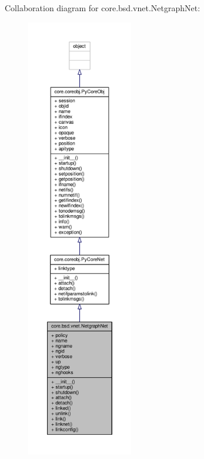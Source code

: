 Collaboration diagram for core.\+bsd.\+vnet.\+Netgraph\+Net\+:
\nopagebreak
\begin{figure}[H]
\begin{center}
\leavevmode
\includegraphics[height=550pt]{classcore_1_1bsd_1_1vnet_1_1_netgraph_net__coll__graph}
\end{center}
\end{figure}
